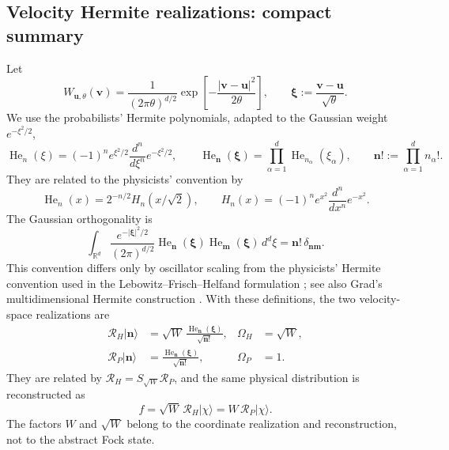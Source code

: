 \documentclass[11pt,oneside]{article}
\numberwithin{equation}{section}
\theoremstyle{definition}
\begin{document}
\subsection{Velocity Hermite realizations: compact summary}
\label{subsec:maxwell_square_root}
Let
\begin{equation}
W_{\bm u,\theta}(\bm v)
=\frac{1}{(2\pi\theta)^{d/2}}
\exp\!\left[-\frac{|\bm v-\bm u|^2}{2\theta}\right],
\qquad
\bm\xi:=\frac{\bm v-\bm u}{\sqrt\theta}.
\label{eq:maxwell_local_W_xi}
\end{equation}
We use the probabilists' Hermite polynomials, adapted to the Gaussian weight $e^{-\xi^2/2}$,
\begin{equation}
\operatorname{He}_n(\xi)
=(-1)^n e^{\xi^2/2}\frac{d^n}{d\xi^n}e^{-\xi^2/2},
\qquad
\operatorname{He}_{\bm n}(\bm\xi)
=\prod_{\alpha=1}^d\operatorname{He}_{n_\alpha}(\xi_\alpha),
\qquad
\bm n!:=\prod_{\alpha=1}^d n_\alpha!.
\label{eq:maxwell_probabilists_hermite}
\end{equation}
They are related to the physicists' convention by
\begin{equation}
\operatorname{He}_n(x)=2^{-n/2}H_n(x/\sqrt2),
\qquad
H_n(x)=(-1)^n e^{x^2}\frac{d^n}{dx^n}e^{-x^2}.
\label{eq:maxwell_hermite_convention_relation}
\end{equation}
The Gaussian orthogonality is
\begin{equation}
\int_{\mathbb R^d}\frac{e^{-|\bm\xi|^2/2}}{(2\pi)^{d/2}}
\operatorname{He}_{\bm n}(\bm\xi)\operatorname{He}_{\bm m}(\bm\xi)\,d^d\xi
=\bm n!\,\delta_{\bm n\bm m}.
\label{eq:maxwell_hermite_orthogonality}
\end{equation}
This convention differs only by oscillator scaling from the physicists' Hermite convention used in the Lebowitz--Frisch--Helfand formulation \cite{Karlin2026LFHFock}; see also Grad's multidimensional Hermite construction \cite{Grad1949Hermite}.  With these definitions, the two velocity-space realizations are
\begin{align}
\mathcal R_H|\bm n\rangle
&=\sqrt W\,
\frac{\operatorname{He}_{\bm n}(\bm\xi)}{\sqrt{\bm n!}},
&\Omega_H&=\sqrt W,
\label{eq:maxwell_H_basis}
\\
\mathcal R_P|\bm n\rangle
&=\frac{\operatorname{He}_{\bm n}(\bm\xi)}{\sqrt{\bm n!}},
&\Omega_P&=1.
\label{eq:maxwell_P_basis}
\end{align}
They are related by $\mathcal R_H=S_{\sqrt W}\mathcal R_P$, and the same physical distribution is reconstructed as
\begin{equation}
f
=\sqrt W\,\mathcal R_H|\chi\rangle
=W\,\mathcal R_P|\chi\rangle.
\label{eq:maxwell_physical_reconstruction_P}
\end{equation}
The factors $W$ and $\sqrt W$ belong to the coordinate realization and reconstruction, not to the abstract Fock state.
\end{document}

